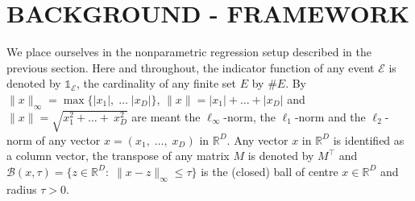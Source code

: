 \section{BACKGROUND - FRAMEWORK}\label{sec:background}
We place ourselves in the nonparametric regression setup described in the previous section. Here and throughout, the indicator function of any event $\mathcal{E}$ is denoted by $\mathds{1}_{\mathcal{E}}$, the cardinality of any finite set $E$ by $\# E$. By $\rVert x\rVert_\infty=\max\{\lvert x_1\rvert,\; \ldots\; \lvert x_D\rvert\}$,  $\rVert x\rVert=\lvert x_1\rvert+\ldots+\lvert x_D\rvert$ and $\rVert x\rVert=\sqrt{ x_1^2+\ldots+\ x_D^2}$ are meant the $\ell_{\infty}$-norm, the $\ell_1$-norm and the $\ell_2$-norm of any vector $x=(x_1,\; \ldots,\; x_D)$ in $\mathbb{R}^D$.  Any vector $x$ in $\mathbb{R}^D$ is identified as a column vector, the transpose of any matrix $M$ is denoted by $M^\intercal$ and $\mathcal{B}(x, \tau)=\{z\in \mathbb{R}^D:\; \rVert x-z\rVert_\infty \leq \tau \}$ is the (closed) ball of centre $x\in \mathbb{R}^D$ and radius $\tau>0$.

